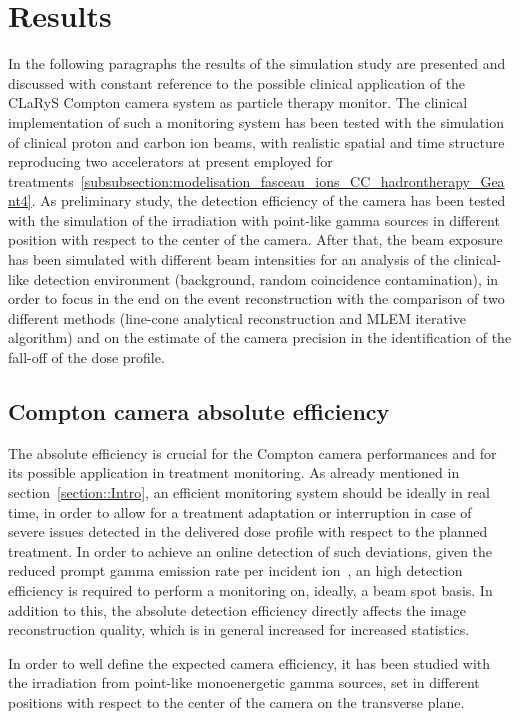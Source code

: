 \section{Results}
In the following paragraphs the results of the simulation study are presented and discussed with constant reference to the possible clinical application of the CLaRyS Compton camera system as particle therapy monitor. The clinical implementation of such a monitoring system has been tested with the simulation of clinical proton and carbon ion beams, with realistic spatial and time structure reproducing two accelerators at present employed for treatments~\ref{subsubsection:modelisation_fasceau_ions_CC_hadrontherapy_Geant4}. As preliminary study, the detection efficiency of the camera has been tested with the simulation of the irradiation with point-like gamma sources in different position with respect to the center of the camera. After that, the beam exposure has been simulated with different beam intensities for an analysis of the clinical-like detection environment (background, random coincidence contamination), in order to focus in the end on the event reconstruction with the comparison of two different methods (line-cone analytical reconstruction and MLEM iterative algorithm) and on the estimate of the camera precision in the identification of the fall-off of the dose profile.


\subsection{Compton camera absolute efficiency}
\label{Results::efficiency}

The absolute efficiency is crucial for the Compton camera performances and for its possible application in treatment monitoring. As already mentioned in section~\ref{section::Intro}, an efficient monitoring system should be ideally in real time, in order to allow for a treatment adaptation or interruption in case of severe issues detected in the delivered dose profile with respect to the planned treatment. In order to achieve an online detection of such deviations, given the reduced prompt gamma emission rate per incident ion~\cite{Ortega:2015aa}, an high detection efficiency is required to perform a monitoring on, ideally, a beam spot basis. In addition to this, the absolute detection efficiency directly affects the image reconstruction quality, which is in general increased for increased statistics.

In order to well define the expected camera efficiency, it has been studied with the irradiation from point-like monoenergetic gamma sources, set in different positions with respect to the center of the camera on the transverse plane.	

